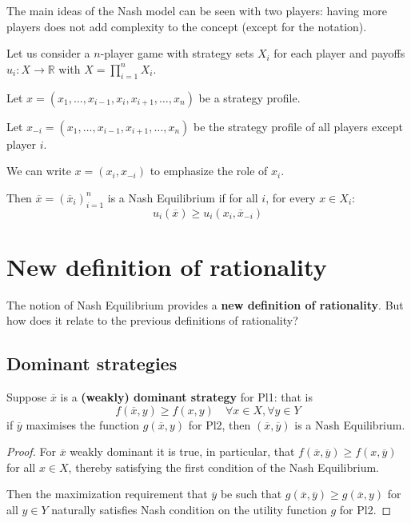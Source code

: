 \documentclass[../main.tex]{subfiles}
\begin{document}
The main ideas of the Nash model can be seen with two players: having more players does not add complexity to the concept (except for the notation).

\begin{definition}
    Let us consider a $n$-player game with strategy sets $X_i$ for each player and payoffs $u_i: X \to \mathbb{R}$ with $X = \prod_{i=1}^n X_i$.

    Let $x = (x_1, \ldots,x_{i-1}, x_i, x_{i+1} ,\ldots, x_n)$ be a strategy profile.

    Let $x_{-i} = (x_1, \ldots, x_{i-1}, x_{i+1}, \ldots, x_n)$ be the strategy profile of all players except player $i$.

    We can write $x = (x_i, x_{-i})$ to emphasize the role of $x_i$.

    Then $\overline{x} = (\overline{x}_i)^n_{i=1}$ is a Nash Equilibrium if for all $i$, for every $x \in X_i$:
    \[
        u_i (\overline{x}) \geq u_i(x_i, \overline{x}_{-i})
    \]
\end{definition}

\section{New definition of rationality}
The notion of Nash Equilibrium provides a \textbf{new definition of rationality}. But how does it relate to the previous definitions of rationality?

\subsection{Dominant strategies}
Suppose $\overline{x}$ is a \textbf{(weakly) dominant strategy} for Pl1: that is
\[
    f(\overline{x}, y) \geq f(x, y) \quad \forall x \in X, \forall y \in Y
\]
if $\overline{y}$ maximises the function $g(\overline{x}, y)$ for Pl2, then $(\overline{x}, \overline{y})$ is a Nash Equilibrium.
\begin{proof}
    For $\overline{x}$ weakly dominant it is true, in particular, that $f(\overline{x}, \overline{y}) \geq f(x, \overline{y})$ for all $x \in X$, thereby satisfying the first condition of the Nash Equilibrium.

    Then the maximization requirement that $\overline{y}$ be such that $g(\overline{x}, \overline{y}) \geq g(\overline{x}, y)$ for all $y \in Y$ naturally satisfies Nash condition on the utility function $g$ for Pl2.
\end{proof}
\end{document}
